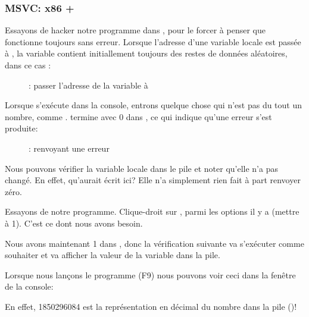 \clearpage
\subsubsection{MSVC: x86 + \olly}

Essayons de hacker notre programme dans \olly, pour le forcer à penser que \scanf
fonctionne toujours sans erreur.
Lorsque l'adresse d'une variable locale est passée à \scanf, la variable contient
initiallement toujours des restes de données aléatoires, dans ce cas :

\begin{figure}[H]
\centering
{}
\caption{\olly: passer l'adresse de la variable à \scanf}
\label{fig:scanf_ex3_olly_1}
\end{figure}

\clearpage
Lorsque \scanf s'exécute dans la console, entrons quelque chose qui n'est pas du
tout un nombre, comme .
\scanf termine avec 0 dans \EAX, ce qui indique qu'une erreur s'est produite:

\begin{figure}[H]
\centering
{}
\caption{\olly: \scanf renvoyant une erreur}
\label{fig:scanf_ex3_olly_2}
\end{figure}

Nous pouvons vérifier la variable locale dans le pile et noter qu'elle n'a pas changé.
En effet, qu'aurait écrit \scanf ici?
Elle n'a simplement rien fait à part renvoyer zéro.

Essayons de  notre programme.
Clique-droit sur \EAX,
parmi les options il y a  (mettre à 1).
C'est ce dont nous avons besoin.

Nous avons maintenant 1 dans \EAX, donc la vérification suivante va s'exécuter comme
souhaiter et \printf va afficher la valeur de la variable dans la pile.

Lorsque nous lançons le programme (F9) nous pouvons voir ceci dans la fenêtre
de la console:



En effet, 1850296084 est la représentation en décimal du nombre dans la pile ()!
